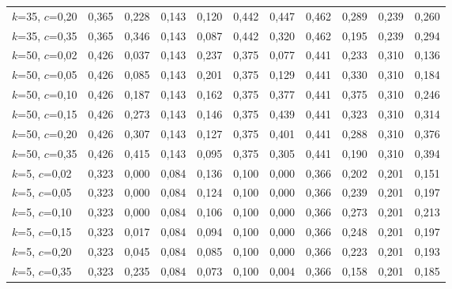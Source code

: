 \begin{longtable}{lrrrrrrrrrr}
$k$=35, $c$=0,20 & 0,365 & 0,228 & 0,143 & 0,120 & 0,442 & 0,447 & 0,462 & 0,289 & 0,239 & 0,260 \\
$k$=35, $c$=0,35 & 0,365 & 0,346 & 0,143 & 0,087 & 0,442 & 0,320 & 0,462 & 0,195 & 0,239 & 0,294 \\
$k$=50, $c$=0,02 & 0,426 & 0,037 & 0,143 & 0,237 & 0,375 & 0,077 & 0,441 & 0,233 & 0,310 & 0,136 \\
$k$=50, $c$=0,05 & 0,426 & 0,085 & 0,143 & 0,201 & 0,375 & 0,129 & 0,441 & 0,330 & 0,310 & 0,184 \\
$k$=50, $c$=0,10 & 0,426 & 0,187 & 0,143 & 0,162 & 0,375 & 0,377 & 0,441 & 0,375 & 0,310 & 0,246 \\
$k$=50, $c$=0,15 & 0,426 & 0,273 & 0,143 & 0,146 & 0,375 & 0,439 & 0,441 & 0,323 & 0,310 & 0,314 \\
$k$=50, $c$=0,20 & 0,426 & 0,307 & 0,143 & 0,127 & 0,375 & 0,401 & 0,441 & 0,288 & 0,310 & 0,376 \\
$k$=50, $c$=0,35 & 0,426 & 0,415 & 0,143 & 0,095 & 0,375 & 0,305 & 0,441 & 0,190 & 0,310 & 0,394 \\
$k$=5, $c$=0,02 & 0,323 & 0,000 & 0,084 & 0,136 & 0,100 & 0,000 & 0,366 & 0,202 & 0,201 & 0,151 \\
$k$=5, $c$=0,05 & 0,323 & 0,000 & 0,084 & 0,124 & 0,100 & 0,000 & 0,366 & 0,239 & 0,201 & 0,197 \\
$k$=5, $c$=0,10 & 0,323 & 0,000 & 0,084 & 0,106 & 0,100 & 0,000 & 0,366 & 0,273 & 0,201 & 0,213 \\
$k$=5, $c$=0,15 & 0,323 & 0,017 & 0,084 & 0,094 & 0,100 & 0,000 & 0,366 & 0,248 & 0,201 & 0,197 \\
$k$=5, $c$=0,20 & 0,323 & 0,045 & 0,084 & 0,085 & 0,100 & 0,000 & 0,366 & 0,223 & 0,201 & 0,193 \\
$k$=5, $c$=0,35 & 0,323 & 0,235 & 0,084 & 0,073 & 0,100 & 0,004 & 0,366 & 0,158 & 0,201 & 0,185 \\
\bottomrule
\end{longtable}
